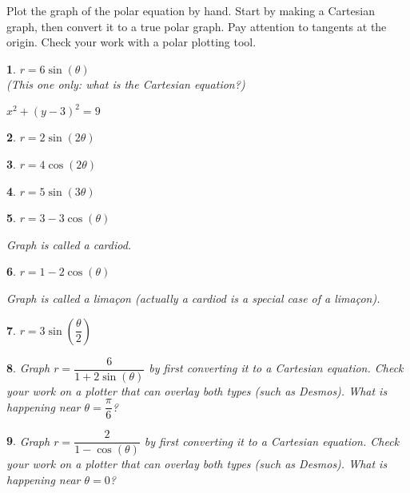 \documentclass{amsbook}
\newtheorem{exc}{}
\newenvironment{ex}{\begin{exc}\normalfont}{\end{exc}}
\numberwithin{section}{chapter}
\numberwithin{equation}{chapter}
\begin{document}
Plot the graph of the polar equation by hand. Start by making a Cartesian graph, then convert it to a true polar graph. Pay attention to tangents at the origin. Check your work with a polar plotting tool.

\begin{multicols}{2}

\begin{ex}
	$r = 6\sin(\theta)$\\
	 {\small(This one only: what is the Cartesian equation?)}
	\begin{sol}
		$x^2+(y-3)^2 = 9$
	\end{sol}
\end{ex}

\begin{ex}
	$r=2\sin(2\theta)$
\end{ex}

\begin{ex}
		$r=4\cos(2\theta)$
\end{ex}

\begin{ex}
		$r=5\sin(3\theta)$
\end{ex}

\begin{ex}
	$r=3-3\cos(\theta)$
	\begin{sol}
		Graph is called a cardiod.
		\end{sol}
\end{ex}

\begin{ex}
	$r=1-2\cos(\theta)$
	\begin{sol}
		Graph is called a lima\c{c}on (actually a cardiod is a special case of a lima\c{c}on).
		\end{sol}
\end{ex}

\begin{ex}
	$r=3\sin\left( \dfrac{\theta}{2} \right)$
\end{ex}

\end{multicols}

\begin{ex}
	Graph $r=\dfrac{6}{1+2\sin(\theta)}$ by first converting it to a Cartesian equation. Check your work on a plotter that can overlay both types (such as Desmos). What is happening near $\theta = \dfrac{\pi}{6}$?
\end{ex}


\begin{ex}
	Graph $r=\dfrac{2}{1-\cos(\theta)}$ by first converting it to a Cartesian equation. Check your work on a plotter that can overlay both types (such as Desmos). What is happening near $\theta = 0$?
\end{ex}
\end{document}
